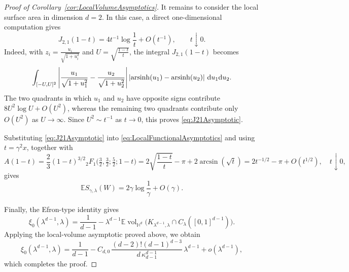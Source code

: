 \documentclass[11pt,a4paper]{article}
\theoremstyle{plain}
\theoremstyle{definition}
\theoremstyle{remark}
\newcommand{\dint}{\textup{d}}
\newcommand{\vol}{\mathop{\mathrm{vol}}\nolimits}
\def\EE{\mathbb{E}}
\def\HH{\mathbb{H}}
\begin{document}
\begin{proof}[Proof of Corollary~\ref{cor:LocalVolumeAsymptotics}]
	It remains to consider the local surface area in dimension $d=2$. In
	this case, a direct one-dimensional computation gives
	\begin{equation}\label{eq:J21Asymptotic}
		J_{2,1}(1-t)
		=
		4t^{-1}\log\frac{1}{t}
		+
		O(t^{-1}),
		\qquad t\downarrow0.
	\end{equation}
	Indeed, with $z_i=\frac{u_i}{\sqrt{1+u_i^2}}$ and $U=\sqrt{\frac{1-t}{t}}$,
	the integral $J_{2,1}(1-t)$ becomes
	\[
		\int_{[-U,U]^2}
		\left|
		\frac{u_1}{\sqrt{1+u_1^2}}
		-
		\frac{u_2}{\sqrt{1+u_2^2}}
		\right|
		\left|
		\operatorname{arsinh}(u_1)
		-
		\operatorname{arsinh}(u_2)
		\right|
		\,\dint u_1\dint u_2.
	\]
	The two quadrants in which $u_1$ and $u_2$ have opposite signs
	contribute
	$8U^2\log U+O(U^2)$, whereas the remaining two quadrants contribute
	only $O(U^2)$ as $U\to\infty$. Since $U^2\sim t^{-1}$ as $t\to 0$, this proves
	\eqref{eq:J21Asymptotic}.

	Substituting \eqref{eq:J21Asymptotic} into
	\eqref{eq:LocalFunctionalAsymptotics} and using
	$t=\gamma^2x$, together with
	\[
		A(1-t)=\frac{2}{3}(1-t)^{3/2}{}_2F_1\!\Big(\tfrac32,\tfrac32;\tfrac52;1-t\Big)
		=2\sqrt{\frac{1-t}{t}}-\pi+2\arcsin(\sqrt{t})
		=
		2t^{-1/2}-\pi+O(t^{1/2}),
		\quad t\downarrow0,
	\]
	gives
	\[
		\EE S_{\gamma,\lambda}(W)
		=
		2\gamma\log\frac{1}{\gamma}
		+
		O(\gamma).
	\]

	Finally, the Efron-type identity gives
	\[
		\xi_0(\lambda^{d-1},\lambda)
		=
		\frac{1}{d-1}
		-
		\lambda^{d-1}
		\EE\vol_{\HH^d}\bigl(
		K_{\lambda^{d-1},\lambda}
		\cap C_\lambda([0,1]^{d-1})
		\bigr).
	\]
	Applying the local-volume asymptotic proved above, we obtain
	\[
		\xi_0(\lambda^{d-1},\lambda)
		=
		\frac{1}{d-1}
		-
		C_{d,0}\,
		\frac{(d-2)!(d-1)^{d-3}}{d\,\kappa_{d-1}^{d-1}}\,
		\lambda^{d-1}
		+
		o(\lambda^{d-1}),
	\]
	which completes the proof.
\end{proof}
\end{document}
